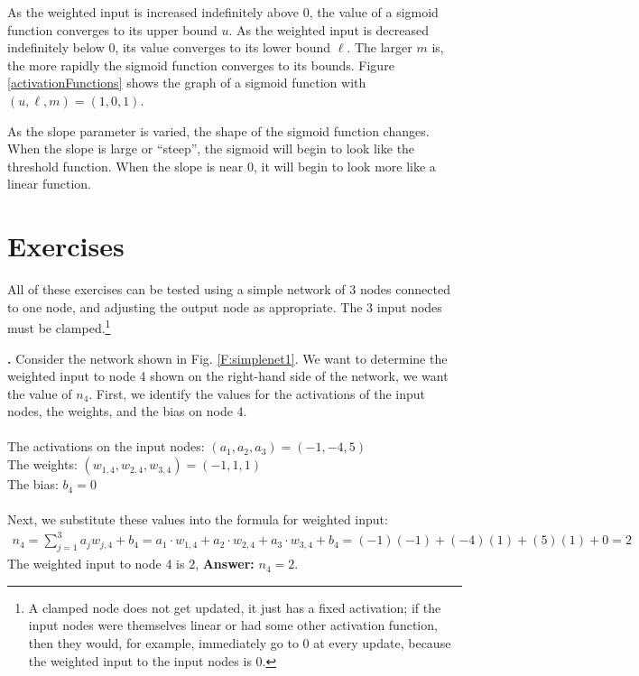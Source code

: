    As the weighted input is increased indefinitely above $0$, the value of a 
sigmoid function converges to its upper bound $u$. As the weighted input is 
decreased indefinitely below $0$, its value converges to its lower bound $\ell$.
The larger $m$ is, the more rapidly the sigmoid function converges to its 
bounds. Figure \ref{activationFunctions} shows the graph of a sigmoid function with 
$(u,\ell,m) = (1,0,1)$. 

As the slope parameter is varied, the shape of the sigmoid function changes. When the slope is
large or ``steep'', the sigmoid will begin to look like the threshold function. When the slope is near $0$, it will begin to look more like a linear function.

\section{Exercises}\label{activation_function_exercises}

   All of these exercises can be tested using a simple network of 3 nodes connected to one node, and 
adjusting the output node as appropriate. The 3 input nodes must be clamped.\footnote{A clamped node does not get updated, it just has a fixed activation; if the input nodes were themselves linear or had some other activation function, then they would, for example, immediately go to 0 at every update, because the weighted input to the input nodes is 0.}
\bigskip


\noindent
{\bf \theActFunctionCounter.}  Consider the network shown in Fig. \ref{F:simplenet1}. We want to determine the weighted 
input to node 4 shown on the right-hand side of the network, \ie we want the
value of $n_4$. First, we identify the values for the activations of the input 
nodes, the weights, and the bias on node 4. \\ \\
\indent \qquad\qquad The activations on the input nodes: $(a_1,a_2,a_3) = 
(-1,-4,5)$ \\
\indent \qquad\qquad The weights: $(w_{1,4}, w_{2,4}, w_{3,4}) = (-1,1,1)$ \\
\indent \qquad\qquad The bias: $b_4 = 0$ \\ \\
Next, we substitute these values into the formula for weighted input:
\begin{eqnarray*}
n_4 = \sum_{j=1}^{3}  a_j  w_{j,4} + b_4 
    =  a_1 \cdot w_{1,4} + a_2 \cdot w_{2,4} + a_3 \cdot w_{3,4} + b_4 
    =      (-1)(-1)      +      (-4)(1)      +       (5)(1)      + 0 
    = 2
\end{eqnarray*}
The weighted input to node 4 is $2$, {\bf Answer:} $n_4=2$.
\bigskip

